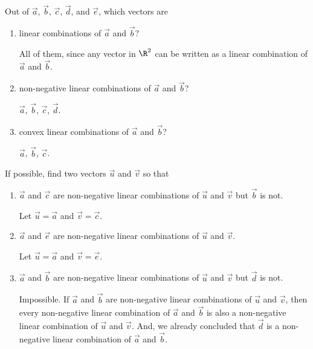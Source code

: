 	\begin{parts}
		\item Out of $\vec a$, $\vec b$, $\vec c$, $\vec d$, and $\vec e$, which
			vectors are
			\begin{enumerate}
				\item linear combinations of $\vec a$ and $\vec b$?
				\begin{solution}[inline]
					All of them, since any vector in $\R^2$ can be written as a linear combination
					of $\vec a$ and $\vec b$.
				\end{solution}

				\item non-negative linear combinations of $\vec a$ and $\vec b$?
				\begin{solution}[inline]
					$\vec a$, $\vec b$, $\vec c$, $\vec d$.
				\end{solution}

				\item convex linear combinations of $\vec a$ and $\vec b$?
				\begin{solution}[inline]
					$\vec a$, $\vec b$, $\vec c$.
				\end{solution}
			\end{enumerate}

		\item If possible, find two vectors $\vec u$ and $\vec v$ so that
			\begin{enumerate}
				\item $\vec a$ and $\vec c$ are non-negative linear combinations
					of $\vec u$ and $\vec v$ but $\vec b$ is not.
				\begin{solution}
					Let $\vec u=\vec a$ and $\vec v=\vec c$.
				\end{solution}

				\item $\vec a$ and $\vec e$ are non-negative linear combinations
					of $\vec u$ and $\vec v$.
				\begin{solution}
					Let $\vec u=\vec a$ and $\vec v=\vec e$.
				\end{solution}

				\item $\vec a$ and $\vec b$ are non-negative linear combinations
					of $\vec u$ and $\vec v$ but $\vec d$ is not.
				\begin{solution}
					Impossible. If $\vec a$ and $\vec b$ are non-negative
					linear combinations of $\vec u$ and $\vec v$, then every non-negative
					linear combination of $\vec a$ and $\vec b$ is also a non-negative
					linear combination of $\vec u$ and $\vec v$. And, we already concluded that
					$\vec d$ is a non-negative linear combination of $\vec a$ and $\vec b$.
				\end{solution}


\end{enumerate}
\end{parts}
